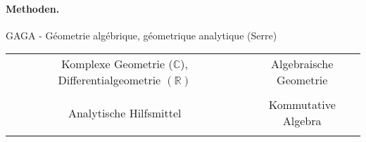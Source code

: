 \paragraph{Methoden.}

GAGA - Géometrie algébrique, géometrique analytique (Serre)\medskip{}

\begin{tabular}{|c|c|}
  \hline 
  Komplexe Geometrie ($\mathbb{C}$), Differentialgeometrie $(\mathbb{R})$ & Algebraische Geometrie\tabularnewline \\
  \hline
  \hline
  Analytische Hilfsmittel & Kommutative Algebra\tabularnewline \\
  \hline 
\end{tabular}
